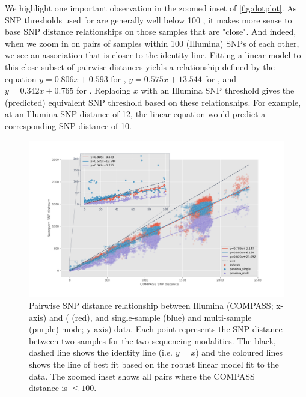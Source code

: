 We highlight one important observation in the zoomed inset of \autoref{fig:dotplot}. As SNP thresholds used for \mtb{} are generally well below 100 \cite{stimson2019}, it makes more sense to base SNP distance relationships on those samples that are "close". And indeed, when we zoom in on pairs of samples within 100 (Illumina) SNPs of each other, we see an association that is closer to the identity line. Fitting a linear model to this close subset of pairwise distances yields a relationship defined by the equation $y=0.806x+0.593$ for \bcftools{}, $y=0.575x+13.544$ for \pandora{} , and $y=0.342x+0.765$ for \compare{}. Replacing $x$ with an Illumina SNP threshold gives the (predicted) equivalent \ont{} SNP threshold based on these relationships. For example, at an Illumina SNP distance of 12, the linear equation would predict a corresponding \bcftools{} \ont{} SNP distance of 10.

\begin{figure}
\begin{center}
\includegraphics[width=0.90\columnwidth]{Chapter2/Figs/combined-dotplots.png}
\caption{{Pairwise SNP distance relationship between Illumina (COMPASS; x-axis) and \ont{} (\bcftools{} (red), and \pandora{} single-sample (blue) and multi-sample (purple) mode; y-axis) data. Each point represents the SNP distance between two samples for the two sequencing modalities. The black, dashed line shows the identity line (i.e. $y=x$) and the coloured lines shows the line of best fit based on the robust linear model fit to the data. The zoomed inset shows all pairs where the COMPASS distance is $\le 100$.
{\label{fig:dotplot}}
}}
\end{center}
\end{figure}


